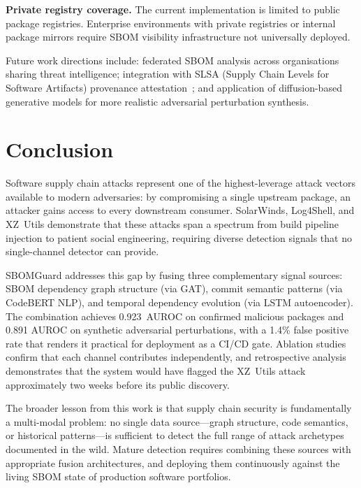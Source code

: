 \documentclass[sigconf,nonacm]{acmart}
\begin{document}
\textbf{Private registry coverage.} The current implementation is limited to
public package registries. Enterprise environments with private registries or
internal package mirrors require SBOM visibility infrastructure not universally
deployed.

Future work directions include: federated SBOM analysis across organisations
sharing threat intelligence; integration with SLSA (Supply Chain Levels for
Software Artifacts) provenance attestation~\cite{slsa}; and application of
diffusion-based generative models for more realistic adversarial perturbation
synthesis.

\section{Conclusion}

Software supply chain attacks represent one of the highest-leverage attack vectors
available to modern adversaries: by compromising a single upstream package, an
attacker gains access to every downstream consumer. SolarWinds, Log4Shell, and
XZ~Utils demonstrate that these attacks span a spectrum from build pipeline
injection to patient social engineering, requiring diverse detection signals
that no single-channel detector can provide.

SBOMGuard addresses this gap by fusing three complementary signal sources: SBOM
dependency graph structure (via GAT), commit semantic patterns (via CodeBERT NLP),
and temporal dependency evolution (via LSTM autoencoder). The combination achieves
0.923~AUROC on confirmed malicious packages and 0.891 AUROC on synthetic adversarial
perturbations, with a 1.4\% false positive rate that renders it practical for
deployment as a CI/CD gate. Ablation studies confirm that each channel contributes
independently, and retrospective analysis demonstrates that the system would have
flagged the XZ~Utils attack approximately two weeks before its public discovery.

The broader lesson from this work is that supply chain security is fundamentally a
multi-modal problem: no single data source---graph structure, code semantics, or
historical patterns---is sufficient to detect the full range of attack archetypes
documented in the wild. Mature detection requires combining these sources with
appropriate fusion architectures, and deploying them continuously against the
living SBOM state of production software portfolios.
\end{document}

